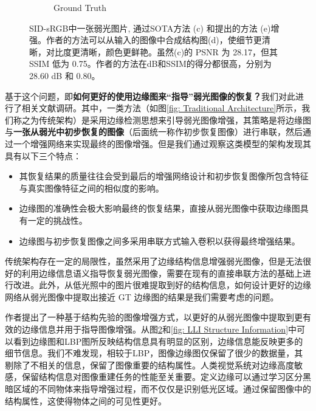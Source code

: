 \documentclass[a4paper]{ctexart}
\begin{document}
\begin{figure}[htb]
\begin{subfigure}{0.25\columnwidth}
			\captionsetup{font=scriptsize}
			\caption{Ground Truth}
			\label{fig: Ground Truth}
		\end{subfigure}
		\caption{
			\label{fig: Structural Information}
			SID-sRGB\cite{chen2018learning}中一张弱光图片, 通过SOTA方法 (c) 和\cite{xu2023low}提出的方法 (e)增强。作者的方法可以从输入的图像中合成结构图(d)，使细节更清晰，对比度更清晰，颜色更鲜艳。虽然(c)的 PSNR 为 28.17，但其 SSIM 低为 0.75。作者的方法在dB和SSIM\cite{wang2004image}的得分都很高，分别为28.60 dB 和 0.80。
		}
	\end{figure}
	
	基于这个问题，即\textbf{如何更好的使用边缘图来“指导”弱光图像的恢复？}我们对此进行了相关文献调研。其中，一类方法（如图\ref{fig: Traditional Architecture}所示，我们称之为传统架构）是采用边缘检测思想来引导弱光图像增强，其策略是将边缘图与\textbf{一张从弱光中初步恢复的图像}（后面统一称作初步恢复图像）进行串联，然后通过一个增强网络来实现最终的图像增强\cite{zhu2020eemefn, rana2021edge}。但是我们通过观察这类模型的架构发现其具有以下三个特点：
	
	\begin{itemize}
		\item [(1)] 其恢复结果的质量往往会受到最后的增强网络设计和初步恢复图像所包含特征与真实图像特征之间的相似度的影响。
		
		\item [(2)] 边缘图的准确性会极大影响最终的恢复结果，直接从弱光图像中获取边缘图具有一定的挑战性。
		
		\item [(3)] 边缘图与初步恢复图像之间多采用串联方式输入卷积以获得最终增强结果。
	\end{itemize}
	
	传统架构存在一定的局限性，虽然采用了边缘结构信息增强弱光图像，但是无法很好的利用边缘信息语义指导恢复弱光图像，需要在现有的直接串联方法的基础上进行改进。此外，从低光照中的图片很难提取到好的结构信息，如何设计更好的边缘网络从弱光图像中提取出接近 GT 边缘图的结果是我们需要考虑的问题。
	
	作者\cite{xu2023low}提出了一种基于结构先验的图像增强方式，以更好的从弱光图像中提取到更有效的边缘信息并用于指导图像增强。从图\ref{fig: Structural Information}和\ref{fig: LLI Structure Information}中可以看到边缘图和LBP图\cite{pietikainen2010local}所反映结构信息具有明显的区别，边缘信息能反映更多的细节信息。我们不难发现，相较于LBP，图像边缘图仅保留了很少的数据量，其剔除了不相关的信息，保留了图像重要的结构属性。人类视觉系统对边缘高度敏感，保留结构信息对图像重建任务的性能至关重要。定义边缘可以通过学习区分黑暗区域的不同物体来指导增强过程，而不仅仅是识别低光区域。通过保留图像中的结构属性，这使得物体之间的可见性更好。
	
\end{document}
